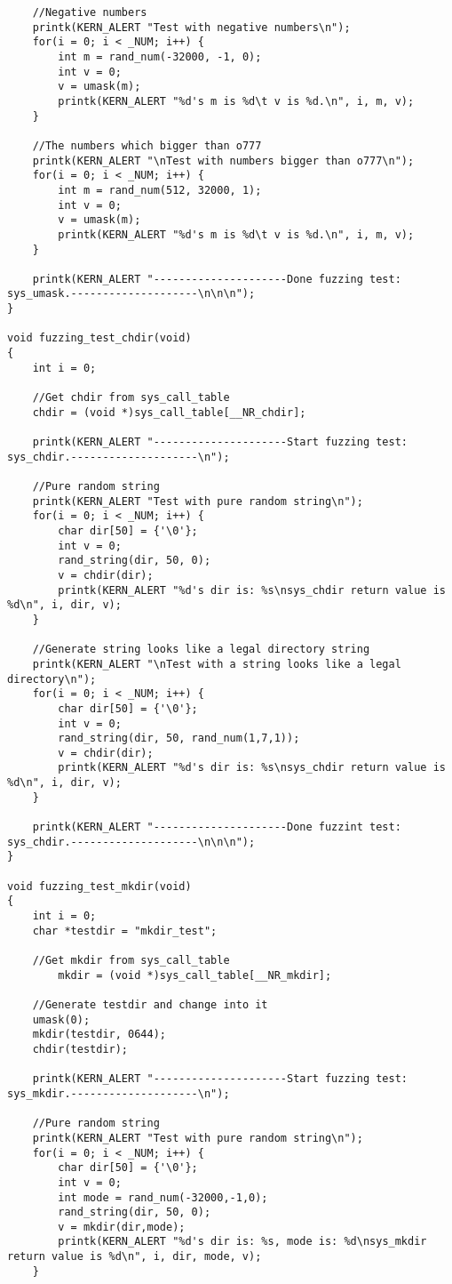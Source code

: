 \documentclass[twoside]{article}
\begin{document}
\begin{lstlisting}
	//Negative numbers
	printk(KERN_ALERT "Test with negative numbers\n");
	for(i = 0; i < _NUM; i++) {
		int m = rand_num(-32000, -1, 0);
		int v = 0;
		v = umask(m);
		printk(KERN_ALERT "%d's m is %d\t v is %d.\n", i, m, v);
	}

	//The numbers which bigger than o777
	printk(KERN_ALERT "\nTest with numbers bigger than o777\n");
	for(i = 0; i < _NUM; i++) {
		int m = rand_num(512, 32000, 1);
		int v = 0;
		v = umask(m);
		printk(KERN_ALERT "%d's m is %d\t v is %d.\n", i, m, v);
	}
	
	printk(KERN_ALERT "---------------------Done fuzzing test: sys_umask.--------------------\n\n\n");
}

void fuzzing_test_chdir(void)
{
	int i = 0;

	//Get chdir from sys_call_table
	chdir = (void *)sys_call_table[__NR_chdir];

	printk(KERN_ALERT "---------------------Start fuzzing test: sys_chdir.--------------------\n");

	//Pure random string
	printk(KERN_ALERT "Test with pure random string\n");
	for(i = 0; i < _NUM; i++) {
		char dir[50] = {'\0'};
		int v = 0;
		rand_string(dir, 50, 0);
		v = chdir(dir);
		printk(KERN_ALERT "%d's dir is: %s\nsys_chdir return value is %d\n", i, dir, v);
	}

	//Generate string looks like a legal directory string
	printk(KERN_ALERT "\nTest with a string looks like a legal directory\n");
	for(i = 0; i < _NUM; i++) {
		char dir[50] = {'\0'};
		int v = 0;
		rand_string(dir, 50, rand_num(1,7,1));
		v = chdir(dir);
		printk(KERN_ALERT "%d's dir is: %s\nsys_chdir return value is %d\n", i, dir, v);
	}
	
	printk(KERN_ALERT "---------------------Done fuzzint test: sys_chdir.--------------------\n\n\n");
}

void fuzzing_test_mkdir(void)
{
	int i = 0;
	char *testdir = "mkdir_test";
	
	//Get mkdir from sys_call_table
       	mkdir = (void *)sys_call_table[__NR_mkdir];

	//Generate testdir and change into it
	umask(0);
	mkdir(testdir, 0644);
	chdir(testdir);
	
	printk(KERN_ALERT "---------------------Start fuzzing test: sys_mkdir.--------------------\n");

	//Pure random string
	printk(KERN_ALERT "Test with pure random string\n");
	for(i = 0; i < _NUM; i++) {
		char dir[50] = {'\0'};
		int v = 0;
		int mode = rand_num(-32000,-1,0);
		rand_string(dir, 50, 0);
		v = mkdir(dir,mode);
		printk(KERN_ALERT "%d's dir is: %s, mode is: %d\nsys_mkdir return value is %d\n", i, dir, mode, v);
	}
	

\end{lstlisting}
\end{document}
